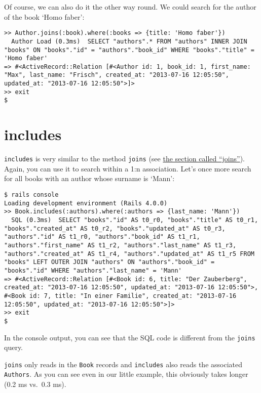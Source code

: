 \documentclass[a4paper]{book}
\begin{document}
Of course, we can also do it the other way round. We could search for the author of the book `Homo faber':

\begin{shaded}\begin{verbatim}
>> Author.joins(:book).where(:books => {title: 'Homo faber'})
  Author Load (0.3ms)  SELECT "authors".* FROM "authors" INNER JOIN "books" ON "books"."id" = "authors"."book_id" WHERE "books"."title" = 'Homo faber'
=> #<ActiveRecord::Relation [#<Author id: 1, book_id: 1, first_name: "Max", last_name: "Frisch", created_at: "2013-07-16 12:05:50", updated_at: "2013-07-16 12:05:50">]>
>> exit
$
\end{verbatim}\end{shaded}

\section{includes}\label{includes}

\texttt{includes} is very similar to the method \texttt{joins} (see \hyperref[activerecordux5f1nux5fjoins]{the section called “joins”}). Again, you can use it to search within a 1:n association. Let's once more search for all books with an author whose surname is `Mann':

\begin{shaded}\begin{verbatim}
$ rails console
Loading development environment (Rails 4.0.0)
>> Book.includes(:authors).where(:authors => {last_name: 'Mann'})
  SQL (0.3ms)  SELECT "books"."id" AS t0_r0, "books"."title" AS t0_r1, "books"."created_at" AS t0_r2, "books"."updated_at" AS t0_r3, "authors"."id" AS t1_r0, "authors"."book_id" AS t1_r1, "authors"."first_name" AS t1_r2, "authors"."last_name" AS t1_r3, "authors"."created_at" AS t1_r4, "authors"."updated_at" AS t1_r5 FROM "books" LEFT OUTER JOIN "authors" ON "authors"."book_id" = "books"."id" WHERE "authors"."last_name" = 'Mann'
=> #<ActiveRecord::Relation [#<Book id: 6, title: "Der Zauberberg", created_at: "2013-07-16 12:05:50", updated_at: "2013-07-16 12:05:50">, #<Book id: 7, title: "In einer Familie", created_at: "2013-07-16 12:05:50", updated_at: "2013-07-16 12:05:50">]>
>> exit
$
\end{verbatim}\end{shaded}

In the console output, you can see that the SQL code is different from the \texttt{joins} query.

\texttt{joins} only reads in the \texttt{Book} records and \texttt{includes} also reads the associated \texttt{Authors}. As you can see even in our little example, this obviously takes longer (0.2 ms vs.~0.3 ms).
\end{document}
